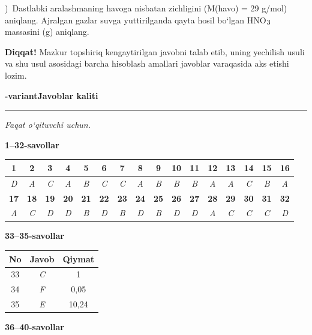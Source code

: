 \documentclass[11pt,a4paper]{article}
\renewcommand{\textsubscript}[1]{\ensuremath{_{\text{\fontsize{8}{8}\selectfont #1}}}}
\newcommand{\qsep}{\par\vspace{13pt}}
\newcommand{\diqqat}[1]{\par\smallskip\noindent\textbf{Diqqat!} #1\par\medskip}
\begin{document}
)\ Dastlabki aralashmaning havoga nisbatan zichligini (M(havo) = 29 g/mol) aniqlang. Ajralgan gazlar suvga yuttirilganda qayta hosil bo`lgan HNO\textsubscript{3} massasini (g) aniqlang.\par
\diqqat{Mazkur topshiriq kengaytirilgan javobni talab etib, uning yechilish usuli va shu usul asosidagi barcha hisoblash amallari javoblar varaqasida aks etishi lozim.}\qsep
\newpage
\noindent\textbf{\fontsize{13}{15}-variant}\hfill \textbf{Javoblar kaliti}\par\smallskip\hrule\smallskip
\textit{Faqat o`qituvchi uchun.}\par\medskip
\noindent\textbf{1--32-savollar}\par\smallskip
\noindent\begin{tabular}{|c|c|c|c|c|c|c|c|c|c|c|c|c|c|c|c|}\hline
\textbf{1} & \textbf{2} & \textbf{3} & \textbf{4} & \textbf{5} & \textbf{6} & \textbf{7} & \textbf{8} & \textbf{9} & \textbf{10} & \textbf{11} & \textbf{12} & \textbf{13} & \textbf{14} & \textbf{15} & \textbf{16}\\\hline
\textsl{D} & \textsl{A} & \textsl{C} & \textsl{A} & \textsl{B} & \textsl{C} & \textsl{C} & \textsl{A} & \textsl{B} & \textsl{B} & \textsl{B} & \textsl{A} & \textsl{A} & \textsl{C} & \textsl{B} & \textsl{A}\\\hline
\textbf{17} & \textbf{18} & \textbf{19} & \textbf{20} & \textbf{21} & \textbf{22} & \textbf{23} & \textbf{24} & \textbf{25} & \textbf{26} & \textbf{27} & \textbf{28} & \textbf{29} & \textbf{30} & \textbf{31} & \textbf{32}\\\hline
\textsl{A} & \textsl{C} & \textsl{D} & \textsl{D} & \textsl{B} & \textsl{D} & \textsl{B} & \textsl{D} & \textsl{B} & \textsl{D} & \textsl{D} & \textsl{A} & \textsl{C} & \textsl{C} & \textsl{C} & \textsl{D}\\\hline
\end{tabular}\par\medskip
\noindent\textbf{33--35-savollar}\par\smallskip
\noindent\begin{tabular}{|c|c|c|}\hline \textbf{No} & \textbf{Javob} & \textbf{Qiymat}\\\hline
33 & \textsl{C} & 1\\\hline
34 & \textsl{F} & 0,05\\\hline
35 & \textsl{E} & 10,24\\\hline
\end{tabular}\par\medskip
\noindent\textbf{36--40-savollar}\par\smallskip
\end{document}
